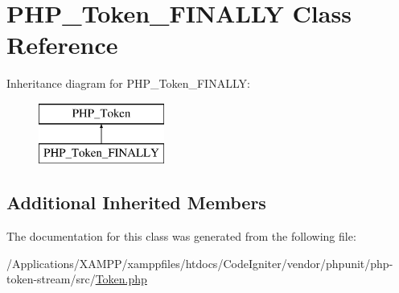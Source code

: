\hypertarget{class_p_h_p___token___f_i_n_a_l_l_y}{}\section{P\+H\+P\+\_\+\+Token\+\_\+\+F\+I\+N\+A\+L\+LY Class Reference}
\label{class_p_h_p___token___f_i_n_a_l_l_y}
Inheritance diagram for P\+H\+P\+\_\+\+Token\+\_\+\+F\+I\+N\+A\+L\+LY\+:\begin{figure}[H]
\begin{center}
\leavevmode
\includegraphics[height=2.000000cm]{class_p_h_p___token___f_i_n_a_l_l_y}
\end{center}
\end{figure}
\subsection*{Additional Inherited Members}


The documentation for this class was generated from the following file\+:\begin{DoxyCompactItemize}
\item 
/\+Applications/\+X\+A\+M\+P\+P/xamppfiles/htdocs/\+Code\+Igniter/vendor/phpunit/php-\/token-\/stream/src/\mbox{\hyperlink{_token_8php}{Token.\+php}}\end{DoxyCompactItemize}
